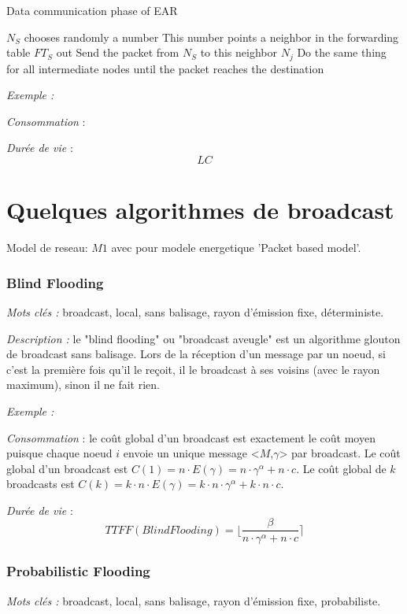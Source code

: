 \begin{algorithm}[H]
\caption{Data communication phase of EAR}
\label{algo_EAR_dcp}
\begin{algorithmic}

\STATE $N_S$ chooses randomly a number
\STATE This number points a neighbor in the forwarding table $FT_S$ out
\STATE Send the packet from $N_S$ to this neighbor $N_j$
\STATE Do the same thing for all intermediate nodes until the packet reaches the destination

\end{algorithmic}
\end{algorithm}


\emph{Exemple :} %

\emph{Consommation} : 

\emph{Durée de vie} : $$ LC $$

\section{Quelques algorithmes de broadcast}
Model de reseau: $M1$ avec pour modele energetique 'Packet based model'.

\subsubsection{Blind Flooding\label{blind_flooding}}
\emph{Mots clés :} broadcast, local, sans balisage, rayon d'émission fixe, déterministe.

\emph{Description :} le "blind flooding" ou "broadcast aveugle" est un algorithme glouton de broadcast sans balisage. Lors de la réception d'un message par un noeud, si c'est la première fois qu'il le reçoit, il le broadcast à ses voisins (avec le rayon maximum), sinon il ne fait rien.

\emph{Exemple :} 

\emph{Consommation} :  le coût global d'un broadcast est exactement le coût moyen puisque chaque noeud $i$ envoie un unique message <$M$,$\gamma$> par broadcast.
Le coût global d'un broadcast est $C(1) = n \cdot E( \gamma )= n\cdot \gamma^\alpha +  n\cdot c $.
Le coût global de $k$ broadcasts est $C(k) = k\cdot n \cdot E( \gamma )= k\cdot n \cdot \gamma^\alpha +  k \cdot n\cdot c $.

\emph{Durée de vie} :   $$TTFF(Blind Flooding)=\lfloor \frac{\beta}{n\cdot \gamma^\alpha +  n\cdot c} \rceil$$



\subsubsection{Probabilistic Flooding\label{proba_flooding}}
\emph{Mots clés :} broadcast, local, sans balisage, rayon d'émission fixe, probabiliste.


